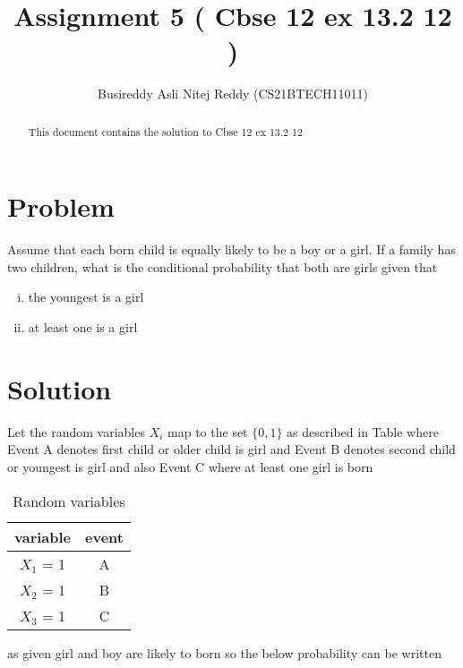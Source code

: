 \documentclass[journal,12pt,twocolumn]{IEEEtran}
\title{Assignment 5 ( Cbse 12 ex 13.2 12 )}
\author{Busireddy Asli Nitej Reddy (CS21BTECH11011)}
\date{}
\begin{document}
\maketitle



\begin{abstract}
This document contains the solution to Cbse 12 ex 13.2 12
\end{abstract}

\section*{\textbf{Problem}}
 Assume that each born child is equally likely to be a boy or a girl. If a family has two children, what is the conditional probability that both are girls given that

     \begin{enumerate}[i)]
         \item  the youngest is a girl
         \item  at least one is a girl
     \end{enumerate}
     

\section*{\textbf{Solution}}
    
    
    Let the random variables $X_{i}$ map to the set $\{ 0,1 \}$ as described in Table
    where Event A denotes first child or older child is girl and Event B denotes second child or youngest is girl and also Event C where at least one girl is born 


    \begin{table}[!htb]
        \centering
         {
            \begin{tabular}{|c|c|}
              \hline
               variable & event \\ \hline
               $X_{1}$ = 1  & A  \\ \hline
               $X_{2}$ = 1  & B  \\ \hline
               $X_{3}$ = 1  & C  \\ \hline
            \end{tabular}
            }
        \caption{ Random variables }
        \label{tab:table}
    \end{table}
    
    as given girl and boy are likely to born so the below probability can be written 
    
\end{document}
